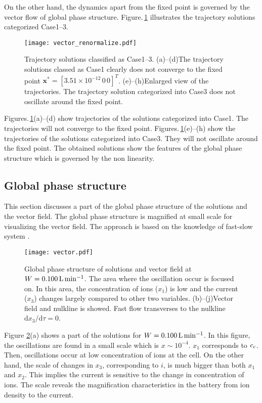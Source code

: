 \documentclass[a4paper]{article}
\newcommand{\ifigref}[1]{Figure.\,\ref{#1}}
\newcommand{\imfigshref}[3]{Figures.\,\ref{#1}(#2)--(#3)}
\newcommand{\Cc}{c_{\rm c}}
\newcommand{\order}[1]{\times10^{#1}}
\newcommand{\fr}{{\rm L\,min^{-1}}}
\newcommand{\dd}[2]{\mathrm{d}#1/\mathrm{d}#2}
\begin{document}
On the other hand, the dynamics apart from the fixed point is governed by the vector flow of global phase structure. 
\ifigref{fig:vector_renormalize} illustrates the trajectory solutions categorized Case1--3.
\begin{figure*}[h]
 \texttt{[image: vector\_renormalize.pdf]}
 \caption{Trajectory solutions classified as Case1--3. (a)--(d)The trajectory solutions classed as Case1 clearly does not converge to the fixed point $\bm{x}^{\ast}=[3.51\order{-12}\,0\,0]^T$. (e)--(h)Enlarged view of the trajectories. The trajectory solution categorized into Case3 does not oscillate around the fixed point. }
 \label{fig:vector_renormalize}
\end{figure*}
\imfigshref{fig:vector_renormalize}{a}{d} show trajectories of the solutions categorized into Case1.
The trajectories will not converge to the fixed point. 
\imfigshref{fig:vector_renormalize}{e}{h} show the trajectories of the solutions categorized into Case3.
They will not oscillate around the fixed point.
The obtained solutions show the features of the global phase structure which is governed by the non linearity. 
\subsection{Global phase structure}
This section discusses 
a part of the global phase structure of the solutions and the vector field. 
The global phase structure is 
magnified at small scale 
for visualizing the vector field. 
The approach is based on the knowledge of fast-slow system 
\cite{hoshino-sent-multiple-time-scale-dynamics-chapter1}. 

\begin{figure*}[h]
 \centering
 \texttt{[image: vector.pdf]}
 \caption{Global phase structure of solutions and vector field at $W=0.100\,\fr$. The area where the oscillation occur is focused on. In this area, the concentration of ions ($x_1$) is low and the current ($x_3$) changes largely compared to other two variables. (b)--(j)Vector field and nulkline is showed. Fast flow transverses to the nulkline $\dd{x_3}{\tau}=0$. }
 \label{fig:vector}
\end{figure*}
Figure \ref{fig:vector}(a) shows a part of the solutions for $W=0.100\,\fr$. 
In this figure, the oscillations are found 
in a small scale which is $x\sim 10^{-4}$. 
$x_1$ corresponds to $\Cc$. 
Then, oscillations occur at low concentration of ions at the cell. 
On the other hand, the scale of changes in $x_3$, 
corresponding to $i$, 
is much bigger than both $x_1$ and $x_2$. 
This implies the current is sensitive to the change in concentration of ions. 
The scale reveals 
the magnification characteristics 
in the battery from ion density to the current. 
\end{document}

